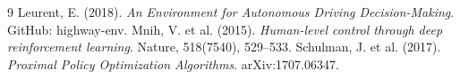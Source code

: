 \documentclass[11pt,a4paper]{article}
\begin{document}
\begin{thebibliography}{9}
 Leurent, E. (2018). \textit{An Environment for Autonomous Driving Decision-Making}. GitHub: highway-env.
 Mnih, V. et al. (2015). \textit{Human-level control through deep reinforcement learning}. Nature, 518(7540), 529--533.
 Schulman, J. et al. (2017). \textit{Proximal Policy Optimization Algorithms}. arXiv:1707.06347.
\end{thebibliography}
\end{document}
